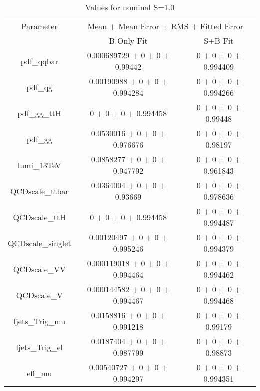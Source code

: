 \begin{table}
\centering
\caption{Values for nominal S=1.0}
\begin{tabular}{ccc}
\toprule
Parameter 	& \multicolumn{2}{c}{Mean $\pm$ Mean Error $\pm$ RMS $\pm$ Fitted Error}\\
 	& B-Only Fit & S+B Fit\\
\midrule
pdf\_qqbar 	& \num{0.000689729} $\pm$ \num{0} $\pm$ \num{0} $\pm$ \num{0.99442} 	& \num{0} $\pm$ \num{0} $\pm$ \num{0} $\pm$ \num{0.994409}\\
pdf\_qg 	& \num{0.00190988} $\pm$ \num{0} $\pm$ \num{0} $\pm$ \num{0.994284} 	& \num{0} $\pm$ \num{0} $\pm$ \num{0} $\pm$ \num{0.994266}\\
pdf\_gg\_ttH 	& \num{0} $\pm$ \num{0} $\pm$ \num{0} $\pm$ \num{0.994458} 	& \num{0} $\pm$ \num{0} $\pm$ \num{0} $\pm$ \num{0.99448}\\
pdf\_gg 	& \num{0.0530016} $\pm$ \num{0} $\pm$ \num{0} $\pm$ \num{0.976676} 	& \num{0} $\pm$ \num{0} $\pm$ \num{0} $\pm$ \num{0.98197}\\
lumi\_13TeV 	& \num{0.0858277} $\pm$ \num{0} $\pm$ \num{0} $\pm$ \num{0.947792} 	& \num{0} $\pm$ \num{0} $\pm$ \num{0} $\pm$ \num{0.961843}\\
QCDscale\_ttbar 	& \num{0.0364004} $\pm$ \num{0} $\pm$ \num{0} $\pm$ \num{0.93669} 	& \num{0} $\pm$ \num{0} $\pm$ \num{0} $\pm$ \num{0.978636}\\
QCDscale\_ttH 	& \num{0} $\pm$ \num{0} $\pm$ \num{0} $\pm$ \num{0.994458} 	& \num{0} $\pm$ \num{0} $\pm$ \num{0} $\pm$ \num{0.994487}\\
QCDscale\_singlet 	& \num{0.00120497} $\pm$ \num{0} $\pm$ \num{0} $\pm$ \num{0.995246} 	& \num{0} $\pm$ \num{0} $\pm$ \num{0} $\pm$ \num{0.994379}\\
QCDscale\_VV 	& \num{0.000119018} $\pm$ \num{0} $\pm$ \num{0} $\pm$ \num{0.994464} 	& \num{0} $\pm$ \num{0} $\pm$ \num{0} $\pm$ \num{0.994462}\\
QCDscale\_V 	& \num{0.000144582} $\pm$ \num{0} $\pm$ \num{0} $\pm$ \num{0.994467} 	& \num{0} $\pm$ \num{0} $\pm$ \num{0} $\pm$ \num{0.994468}\\
ljets\_Trig\_mu 	& \num{0.0158816} $\pm$ \num{0} $\pm$ \num{0} $\pm$ \num{0.991218} 	& \num{0} $\pm$ \num{0} $\pm$ \num{0} $\pm$ \num{0.99179}\\
ljets\_Trig\_el 	& \num{0.0187404} $\pm$ \num{0} $\pm$ \num{0} $\pm$ \num{0.987799} 	& \num{0} $\pm$ \num{0} $\pm$ \num{0} $\pm$ \num{0.98873}\\
eff\_mu 	& \num{0.00540727} $\pm$ \num{0} $\pm$ \num{0} $\pm$ \num{0.994297} 	& \num{0} $\pm$ \num{0} $\pm$ \num{0} $\pm$ \num{0.994351}\\

\end{tabular}
\end{table}
